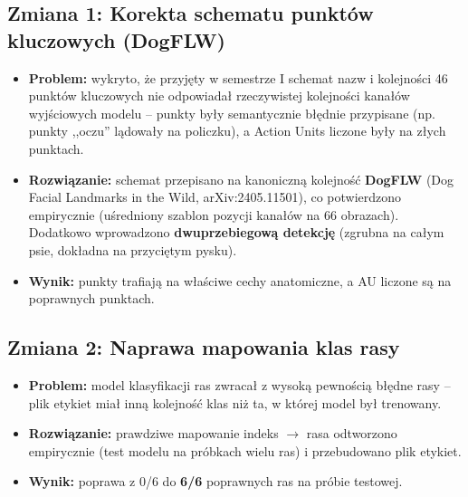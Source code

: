 \documentclass[11pt,a4paper]{article}
\begin{document}
\subsection{Zmiana 1: Korekta schematu punktów kluczowych (DogFLW)}
\begin{itemize}
  \item \textbf{Problem:} wykryto, że przyjęty w semestrze I schemat nazw i kolejności
        46 punktów kluczowych nie odpowiadał rzeczywistej kolejności kanałów wyjściowych
        modelu -- punkty były semantycznie błędnie przypisane (np. punkty
        ,,oczu'' lądowały na policzku), a Action Units liczone były na złych punktach.
  \item \textbf{Rozwiązanie:} schemat przepisano na kanoniczną kolejność
        \textbf{DogFLW} (Dog Facial Landmarks in the Wild, arXiv:2405.11501),
        co potwierdzono empirycznie (uśredniony szablon pozycji kanałów na 66 obrazach).
        Dodatkowo wprowadzono \textbf{dwuprzebiegową detekcję} (zgrubna na całym psie,
        dokładna na przyciętym pysku).
  \item \textbf{Wynik:} punkty trafiają na właściwe cechy anatomiczne, a AU liczone są
        na poprawnych punktach.
\end{itemize}

\subsection{Zmiana 2: Naprawa mapowania klas rasy}
\begin{itemize}
  \item \textbf{Problem:} model klasyfikacji ras zwracał z wysoką pewnością błędne rasy --
        plik etykiet miał inną kolejność klas niż ta, w której model był trenowany.
  \item \textbf{Rozwiązanie:} prawdziwe mapowanie indeks $\rightarrow$ rasa odtworzono
        empirycznie (test modelu na próbkach wielu ras) i przebudowano plik etykiet.
  \item \textbf{Wynik:} poprawa z 0/6 do \textbf{6/6} poprawnych ras na próbie testowej.
\end{itemize}
\end{document}
